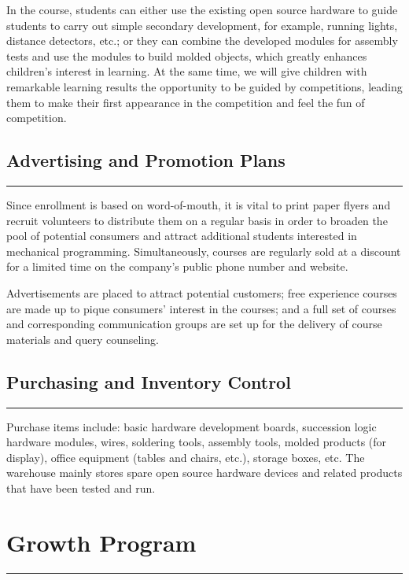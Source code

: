 \documentclass[12pt]{extarticle}
\numberwithin{figure}{section}
\begin{document}
In the course, students can either use the existing open source hardware to guide students to carry out simple secondary development, for example, running lights, distance detectors, etc.; or they can combine the developed modules for assembly tests and use the modules to build molded objects, which greatly enhances children's interest in learning. At the same time, we will give children with remarkable learning results the opportunity to be guided by competitions, leading them to make their first appearance in the competition and feel the fun of competition.
\subsection{Advertising and Promotion Plans}
\vspace{-0.1cm}
\hrule
\vspace{0.2cm}

Since enrollment is based on word-of-mouth, it is vital to print paper flyers and recruit volunteers to distribute them on a regular basis in order to broaden the pool of potential consumers and attract additional students interested in mechanical programming. Simultaneously, courses are regularly sold at a discount for a limited time on the company's public phone number and website.

Advertisements are placed to attract potential customers; free experience courses are made up to pique consumers' interest in the courses; and a full set of courses and corresponding communication groups are set up for the delivery of course materials and query counseling.
\subsection{Purchasing and Inventory Control}
\vspace{-0.1cm}
\hrule
\vspace{0.2cm}
Purchase items include: basic hardware development boards, succession logic hardware modules, wires, soldering tools, assembly tools, molded products (for display), office equipment (tables and chairs, etc.), storage boxes, etc. The warehouse mainly stores spare open source hardware devices and related products that have been tested and run.
\section{Growth Program}
\vspace{-0.1cm}
\hrule
\vspace{0.2cm}
\end{document}
